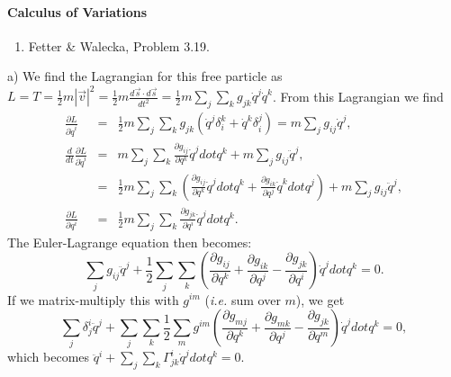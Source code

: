 \documentclass[letterpaper,11pt]{article}
\begin{document}
\paragraph*{Calculus of Variations}
\begin{enumerate}[resume]
 \item Fetter \& Walecka, Problem 3.19.
\end{enumerate}

a) We find the Lagrangian for this free particle as $L = T = \frac{1}{2} m |\vec{v}|^2 = \frac{1}{2} m \frac{d\vec{s} \cdot d\vec{s}}{dt^2} = \frac{1}{2} m \sum_j \sum_k g_{jk} \dot{q}^j \dot{q}^k$.  From this Lagrangian we find
\begin{eqnarray*}
\frac{\partial L}{\partial \dot{q}^i} & = & \frac{1}{2} m \sum_j \sum_k g_{jk} (\dot{q}^j \delta_i^k + \dot{q}^k \delta_i^j) = m \sum_j g_{ij} \dot{q}^j, \\
\frac{d}{dt} \frac{\partial L}{\partial \dot{q}^i} & = & m \sum_j \sum_k \frac{\partial g_{ij}}{\partial q^k} \dot{q}^j dot{q}^k + m \sum_j g_{ij} \ddot{q}^j, \\
 & = & \frac{1}{2} m \sum_j \sum_k \left( \frac{\partial g_{ij}}{\partial q^k} \dot{q}^j dot{q}^k + \frac{\partial g_{ik}}{\partial q^j} \dot{q}^k dot{q}^j \right) + m \sum_j g_{ij} \ddot{q}^j, \\
\frac{\partial L}{\partial q^i} & = & \frac{1}{2} m \sum_j \sum_k \frac{\partial g_{jk}}{\partial q^i} \dot{q}^j dot{q}^k.
\end{eqnarray*}
The Euler-Lagrange equation then becomes:
\begin{equation*}
 \sum_j g_{ij} \ddot{q}^j + \frac{1}{2} \sum_j \sum_k \left( \frac{\partial g_{ij}}{\partial q^k} + \frac{\partial g_{ik}}{\partial q^j} - \frac{\partial g_{jk}}{\partial q^i} \right) \dot{q}^j dot{q}^k = 0.
\end{equation*}
If we matrix-multiply this with $g^{im}$ (\textit{i.e.} sum over $m$), we get
\begin{equation*}
 \sum_j \delta^i_j \ddot{q}^j + \sum_j \sum_k \frac{1}{2} \sum_m g^{im} \left( \frac{\partial g_{mj}}{\partial q^k} + \frac{\partial g_{mk}}{\partial q^j} - \frac{\partial g_{jk}}{\partial q^m} \right) \dot{q}^j dot{q}^k = 0,
\end{equation*}
which becomes $\ddot{q}^i + \sum_j \sum_k \Gamma^i_{jk} \dot{q}^j dot{q}^k = 0$.
\end{document}
